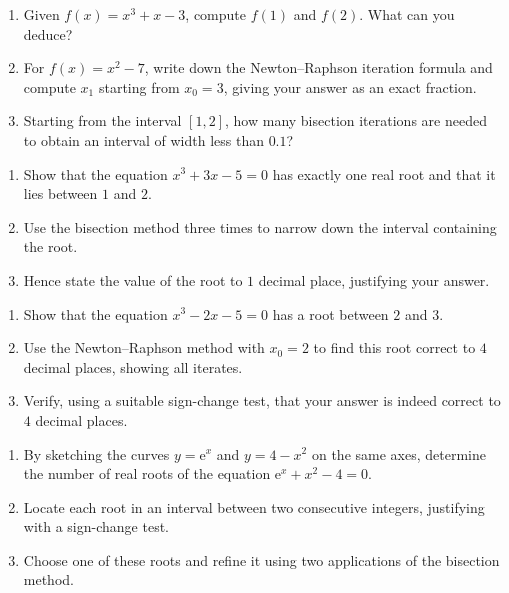 \documentclass[11pt]{article}
\newcounter{popsec}
\newcounter{popsub}
\newcommand{\courssub}[1]{%
  \stepcounter{popsub}%
  \par\vspace{9pt}\noindent{\popxbold\fontsize{11.5}{13}\selectfont\color{popink}{\color{poporange}\thepopsec.\thepopsub}\hspace{6pt}#1}\par\nopagebreak\vspace{4pt}
}
\begin{document}
\begin{exercice}
\begin{enumerate}
\item Given $f(x)=x^{3}+x-3$, compute $f(1)$ and $f(2)$. What can you deduce?
\item For $f(x)=x^{2}-7$, write down the Newton--Raphson iteration formula and compute $x_{1}$ starting from $x_{0}=3$, giving your answer as an exact fraction.
\item Starting from the interval $[1,2]$, how many bisection iterations are needed to obtain an interval of width less than $0.1$?
\end{enumerate}
\end{exercice}

\courssub{I practise}

\begin{exercice}
\begin{enumerate}
\item Show that the equation $x^{3}+3x-5=0$ has exactly one real root and that it lies between $1$ and $2$.
\item Use the bisection method three times to narrow down the interval containing the root.
\item Hence state the value of the root to $1$ decimal place, justifying your answer.
\end{enumerate}
\end{exercice}

\begin{exercice}
\begin{enumerate}
\item Show that the equation $x^{3}-2x-5=0$ has a root between $2$ and $3$.
\item Use the Newton--Raphson method with $x_{0}=2$ to find this root correct to $4$ decimal places, showing all iterates.
\item Verify, using a suitable sign-change test, that your answer is indeed correct to $4$ decimal places.
\end{enumerate}
\end{exercice}

\begin{exercice}
\begin{enumerate}
\item By sketching the curves $y=\mathrm{e}^{x}$ and $y=4-x^{2}$ on the same axes, determine the number of real roots of the equation $\mathrm{e}^{x}+x^{2}-4=0$.
\item Locate each root in an interval between two consecutive integers, justifying with a sign-change test.
\item Choose one of these roots and refine it using two applications of the bisection method.
\end{enumerate}
\end{exercice}
\end{document}
